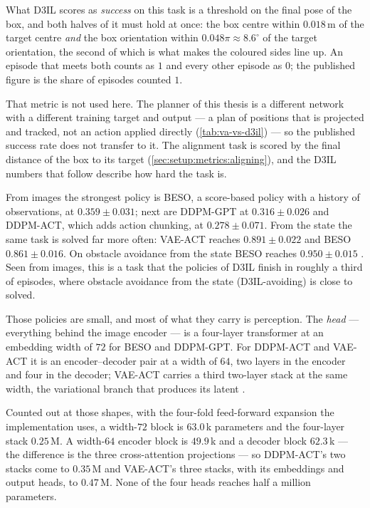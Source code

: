What D3IL scores as \emph{success} on this task is a threshold on the final pose of the box, and both
halves of it must hold at once: the box centre within $0.018$\,m of the target centre \emph{and} the box
orientation within $0.048\pi \approx 8.6^{\circ}$ of the target orientation, the second of which is what
makes the coloured sides line up. An episode that meets both counts as $1$ and every other episode as $0$;
the published figure is the share of episodes counted $1$.

That metric is not used here. The planner of this thesis is a different network with a different
training target and output --- a plan of positions that is projected and tracked, not an action applied
directly (\autoref{tab:va-vs-d3il}) --- so the published success rate does not transfer to it. The
alignment task is scored by the final distance of the box to its target
(\autoref{sec:setup:metrics:aligning}), and the D3IL numbers that follow describe how hard the task is.

From images the strongest policy is BESO, a
score-based policy with a history of observations, at $0.359\pm0.031$; next are DDPM-GPT at
$0.316\pm0.026$ and DDPM-ACT, which adds action chunking, at $0.278\pm0.071$. From the state the same task
is solved far more often: VAE-ACT reaches $0.891\pm0.022$ and BESO $0.861\pm0.016$. On obstacle avoidance
from the state BESO reaches $0.950\pm0.015$ \parencite[Table~3]{jia2024towards}. Seen from images, this is a
task that the policies of D3IL finish in roughly a third of episodes, where obstacle avoidance from the
state (D3IL-avoiding) is close to solved.

Those policies are small, and most of what they carry is perception. The \emph{head} --- everything behind
the image encoder --- is a four-layer transformer at an embedding width of $72$ for BESO and DDPM-GPT. For
DDPM-ACT and VAE-ACT it is an encoder--decoder pair at a width of $64$, two layers in the encoder and four
in the decoder; VAE-ACT carries a third two-layer stack at the same width, the variational branch that
produces its latent \parencite[Table~9]{jia2024towards}.

Counted out at those shapes, with the four-fold feed-forward expansion the implementation uses, a
width-$72$ block is $63.0$\,k parameters and the four-layer stack $0.25$\,M. A width-$64$ encoder block is
$49.9$\,k and a decoder block $62.3$\,k --- the difference is the three cross-attention projections --- so
DDPM-ACT's two stacks come to $0.35$\,M and VAE-ACT's three stacks, with its embeddings and output heads,
to $0.47$\,M. None of the four heads reaches half a million parameters.

